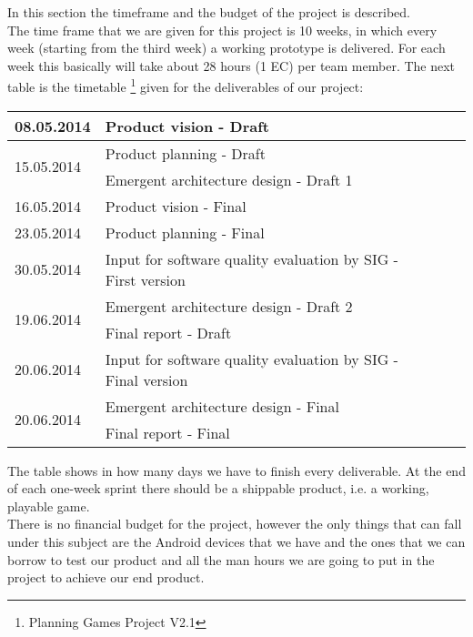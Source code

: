 In this section the timeframe and the budget of the project is described. \\
The time frame that we are given for this project is 10 weeks, in which every week (starting from the third week) a working prototype is delivered. For each week this basically will take about 28 hours (1 EC) per team member. 
The next table is the timetable \footnote{Planning Games Project V2.1} given for the deliverables of our project:
\begin{center}
	\begin{tabular}{|  p{5cm}| l | p{10cm}  l }
		\hline
	 	08.05.2014 & Product vision - Draft \\ \hline
		\multirow{2}{*}{15.05.2014} & Product planning - Draft \\ \cline{2-2}
		& Emergent architecture design - Draft 1 \\ \hline
		16.05.2014 & Product vision - Final \\ \hline
		23.05.2014 & Product planning - Final \\ \hline
		30.05.2014 & Input for software quality evaluation by SIG - First version \\ \hline
		\multirow{2}{*}{19.06.2014} & Emergent architecture design - Draft 2 \\ \cline{2-2}
		& Final report - Draft \\ \hline
		20.06.2014 & Input for software quality evaluation by SIG - Final version \\ \hline
		\multirow{2}{*}{20.06.2014} & Emergent architecture design - Final \\ \cline{2-2}
		& Final report - Final \\ \hline
	\end{tabular}
\end{center}
The table shows in how many days we have to finish every deliverable. At the end of each one-week sprint there should be a shippable product, i.e. a working, playable game. \\
\newline
There is no financial budget for the project, however the only things that can fall under this subject are the Android devices that we have and the ones that we can borrow to test our product and all the man hours we are going to put in the project to achieve our end product.